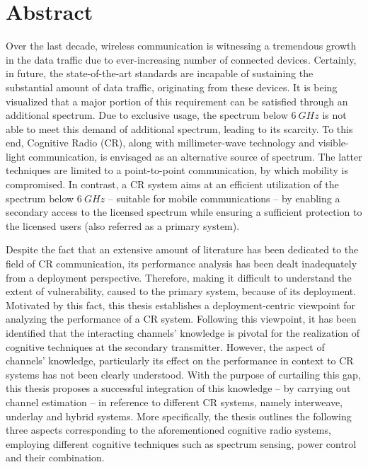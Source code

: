 
\chapter*{Abstract}
Over the last decade, wireless communication is witnessing a tremendous growth in the data traffic due to ever-increasing number of connected devices. Certainly, in future, the state-of-the-art standards are incapable of sustaining the substantial amount of data traffic, originating from these devices. It is being visualized that a major portion of this requirement can be satisfied through an additional spectrum. Due to exclusive usage, the spectrum below $\SI{6}{GHz}$ is not able to meet this demand of additional spectrum, leading to its scarcity. To this end, Cognitive Radio (CR), along with millimeter-wave technology and visible-light communication, is envisaged as an alternative source of spectrum. The latter techniques are limited to a point-to-point communication, by which mobility is compromised. In contrast, a CR system aims at an efficient utilization of the spectrum below $\SI{6}{GHz}$ -- suitable for mobile communications -- by enabling a secondary access to the licensed spectrum while ensuring a sufficient protection to the licensed users (also referred as a primary system). %


Despite the fact that an extensive amount of literature has been dedicated to the field of CR communication, its performance analysis has been dealt inadequately from a deployment perspective. Therefore, making it difficult to understand the extent of vulnerability, caused to the primary system, because of its deployment. Motivated by this fact, this thesis establishes a deployment-centric viewpoint for analyzing the performance of a CR system. Following this viewpoint, it has been identified that the interacting channels' knowledge is pivotal for the realization of cognitive techniques at the secondary transmitter. However, the aspect of channels' knowledge, particularly its effect on the performance in context to CR systems has not been clearly understood. With the purpose of curtailing this gap, this thesis proposes a successful integration of this knowledge -- by carrying out channel estimation -- in reference to different CR systems, namely interweave, underlay and hybrid systems. More specifically, the thesis outlines the following three aspects corresponding to the aforementioned cognitive radio systems, employing different cognitive techniques such as spectrum sensing, power control and their combination.

